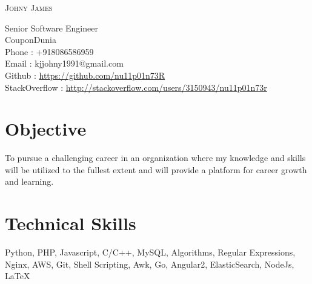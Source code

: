 \documentclass[a4paper]{article}
\begin{document}
\pagestyle{empty}
\begin{center}

\Large
\textsc{Johny James}%
\end{center}
\vspace{1.2\baselineskip}
\begin{flushleft}
    Senior Software Engineer \\
    CouponDunia \\
    Phone : +918086586959 \\
    Email : kjjohny1991@gmail.com \\
    Github : \url{https://github.com/nu11p01n73R} \\ 
    StackOverflow : \url{http://stackoverflow.com/users/3150943/nu11p01n73r}
\end{flushleft}

\section{Objective}
\begin{flushleft}
    To pursue a challenging career in an organization where my knowledge and skills will be
    utilized to the fullest extent and will provide a platform for career growth and learning.
\end{flushleft}

\section{Technical Skills}
\begin{flushleft}
    Python, PHP, Javascript, C/C++, MySQL, Algorithms, Regular Expressions, Nginx, AWS, Git, Shell Scripting, Awk, Go, Angular2, ElasticSearch, NodeJs, \LaTeX
\end{flushleft}
\end{document}

